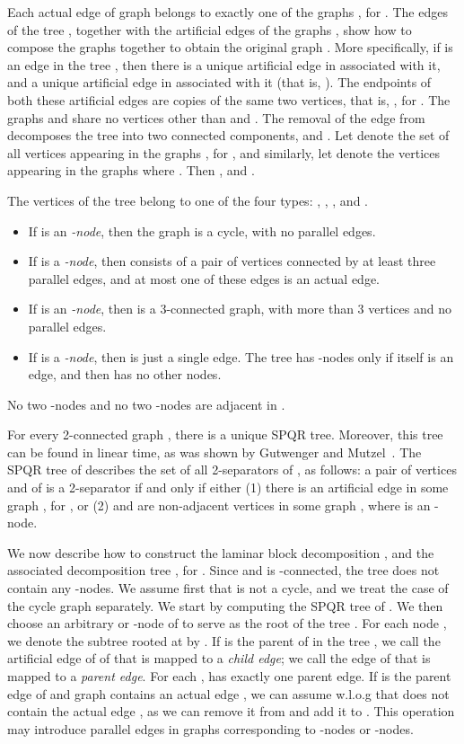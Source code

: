 \documentclass[twoside,leqno,twocolumn]{article}
\begin{document}
Each actual edge of graph  belongs to exactly one of the graphs , for . The edges of the tree , together with the artificial edges of the graphs , show how to compose the graphs  together to obtain the original graph . More specifically, if  is an edge in the tree , then there is a unique artificial edge  in  associated with it, and a unique artificial edge  in  associated with it (that is, ). The endpoints of both these artificial edges are copies of the same two vertices, that is, , for . 
The graphs  and  share no vertices other than  and .
The removal of the edge  from  decomposes the tree into two connected components,  and . Let  denote the set of all vertices appearing in the graphs , for , and similarly, let  denote the vertices appearing in the graphs  where . Then , and . 

The vertices of the tree  belong to one of the four types: , , , and .
\begin{itemize}
\item If  is an \emph{-node}, then the graph  is a cycle, with no parallel edges.
\item If  is a \emph{-node}, then  consists of a pair of vertices connected by at least 
three parallel edges, and at most one of these edges is an actual edge.
\item If  is an \emph{-node}, then  is a 3-connected graph, with more than 3 vertices and
no parallel edges.
\item If  is a \emph{-node}, then  is just a single edge. The tree  has
-nodes only if  itself is an edge, and then  has no other nodes.
\end{itemize}
No two -nodes and no two -nodes are adjacent in .

For every 2-connected graph , there is a unique SPQR tree. Moreover,
this tree can be found in linear time, as was shown by Gutwenger and Mutzel~\cite{SPQR-trees}.  
The SPQR tree of  describes the set of all 2-separators of , as follows: a pair of 
vertices  and  of  is a 2-separator if and only if either (1) there is an artificial edge  in some graph , for , or (2)  and  are non-adjacent vertices in some graph 
, where  is an -node.


We now describe how to construct the laminar block decomposition , and the associated decomposition tree , for . Since  and  is -connected, the tree  does not contain any -nodes.
We assume first that  is not a cycle, and we treat the case of the cycle graph 
separately. We start by computing the SPQR tree  of . We then choose an arbitrary 
 or -node  of  to serve as the root of the tree . For each node , we denote the subtree rooted at
 by . If  is the parent of  in the tree , we call the artificial edge 
of  of  that is mapped to  a \emph{child edge};
we call the edge of  that is mapped to  a \emph{parent edge}. For each ,   has exactly one parent edge. If  is the parent edge of  and graph  contains an actual edge , we can assume w.l.o.g that  does not contain the actual edge , as we can remove it from  and add it to . This operation may introduce parallel edges in graphs  corresponding to -nodes or -nodes. 
\end{document}

